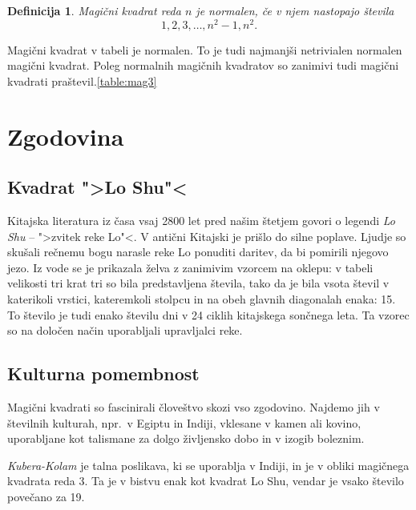 \documentclass[a4paper,12pt]{article}
\newtheorem{definicija}{Definicija}
\begin{document}
\begin{definicija}
   \label{definicija}
   Magični kvadrat reda \(n\) je \emph{normalen}, če v njem nastopajo števila
   \begin{equation}
      \label{eq:numbers}
      1, 2, 3, \ldots, n^2-1, n^2.
   \end{equation}
\end{definicija}

Magični kvadrat v tabeli \pageref je normalen.
To je tudi najmanjši netrivialen normalen magični kvadrat.
Poleg normalnih magičnih kvadratov so zanimivi tudi magični kvadrati praštevil.\ref{table:mag3} %


\section{Zgodovina}

\subsection{Kvadrat ">Lo Shu"<}

Kitajska literatura iz časa vsaj 2800 let pred našim štetjem govori o legendi
\emph{Lo Shu} -- ">zvitek reke Lo"<. V antični Kitajski je prišlo do
silne poplave. Ljudje so skušali rečnemu bogu narasle reke Lo ponuditi daritev,
da bi pomirili njegovo jezo. Iz vode se je prikazala želva z zanimivim vzorcem
na oklepu: v tabeli velikosti tri krat tri so bila predstavljena števila, tako
da je bila vsota števil v katerikoli vrstici, kateremkoli stolpcu in na obeh
glavnih diagonalah enaka: 15. To število je tudi enako številu dni v 24 ciklih
kitajskega sončnega leta. Ta vzorec so na določen način uporabljali upravljalci
reke.


\subsection{Kulturna pomembnost}

Magični kvadrati so fascinirali človeštvo skozi vso zgodovino. Najdemo jih
v številnih kulturah, npr.\ v Egiptu in Indiji, vklesane v kamen ali
kovino, uporabljane kot talismane za dolgo življensko dobo in v
izogib boleznim.

\emph{Kubera-Kolam} je talna poslikava, ki se uporablja v Indiji, in je v
obliki magičnega kvadrata reda 3. Ta je v bistvu enak kot kvadrat
Lo Shu, vendar je vsako število povečano za 19.
\end{document}

